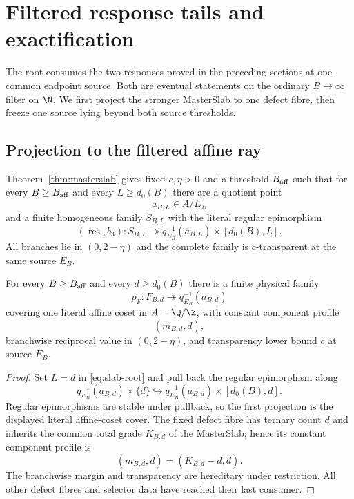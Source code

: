 
\section{Filtered response tails and exactification}
\label{sec:germs}

The root consumes the two responses proved in the preceding sections at one
common endpoint source.  Both are eventual statements on the ordinary
$B\to\infty$ filter on $\N$.  We first project the stronger MasterSlab to one
defect fibre, then freeze one source lying beyond both source thresholds.

\subsection{Projection to the filtered affine ray}

Theorem~\ref{thm:masterslab} gives fixed $c,\eta>0$ and a threshold
$B_{\rm aff}$ such that for every $B\ge B_{\rm aff}$ and every
$L\ge d_0(B)$ there are a quotient point
\[
a_{B,L}\in A/E_B
\]
and a finite homogeneous family $S_{B,L}$ with the literal regular epimorphism
\[
(\operatorname{res},b_3):
S_{B,L}\twoheadrightarrow
q_{E_B}^{-1}(a_{B,L})\times[d_0(B),L].
\tag{F1}\label{eq:slab-root}
\]
All branches lie in $(0,2-\eta)$ and the complete family is
$c$-transparent at the same source $E_B$.

\begin{proposition}
\label{prop:affine-ray-projection}
For every $B\ge B_{\rm aff}$ and every $d\ge d_0(B)$ there is a finite
physical family
\[
p_F:F_{B,d}\twoheadrightarrow q_{E_B}^{-1}(a_{B,d})
\]
covering one literal affine coset in $A=\Q/\Z$, with constant component profile
\[
(m_{B,d},d),
\]
branchwise reciprocal value in $(0,2-\eta)$, and transparency lower bound $c$
at source $E_B$.
\end{proposition}

\begin{proof}
Set $L=d$ in \eqref{eq:slab-root} and pull back the regular epimorphism along
\[
q_{E_B}^{-1}(a_{B,d})\times\{d\}
\hookrightarrow
q_{E_B}^{-1}(a_{B,d})\times[d_0(B),d].
\]
Regular epimorphisms are stable under pullback, so the first projection is the
displayed literal affine-coset cover.  The fixed defect fibre has ternary count
$d$ and inherits the common total grade $K_{B,d}$ of the MasterSlab; hence its
constant component profile is
\[
(m_{B,d},d)=(K_{B,d}-d,d).
\]
The branchwise margin and transparency are hereditary under restriction.
All other defect fibres and selector data have reached their last consumer.
\end{proof}

